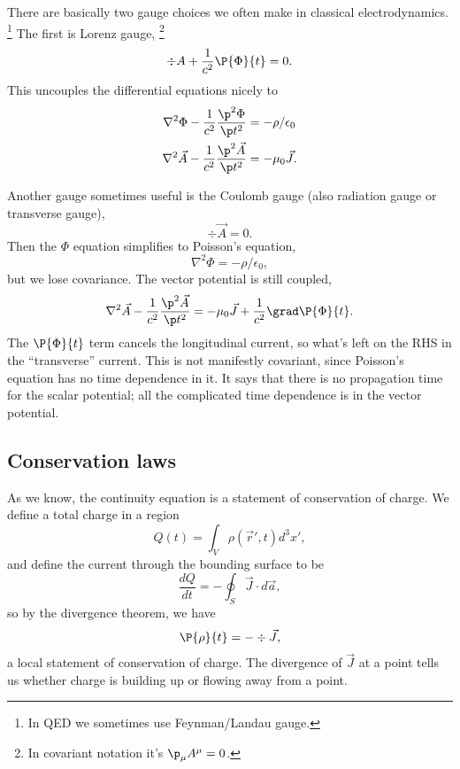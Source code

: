 There are basically two gauge choices we often make in classical electrodynamics.%
    \footnote{In QED we sometimes use Feynman/Landau gauge.}
The first is Lorenz gauge,%
    \footnote{In covariant notation it's $\p_\mu A^\mu=0$.}
\begin{equation}
    \div A + \frac{1}{c^2}\P{\Phi}{t} =0.
\end{equation}
This uncouples the differential equations 
nicely to
\begin{align}
    \nabla^2 \Phi -\frac{1}{c^2} \frac{\p^2\Phi}{\p t^2} &= -\rho/\epsilon_0\\
    \nabla^2 \vec A -\frac{1}{c^2} \frac{\p^2\vec A}{\p t^2} &= -\mu_0 \vec J.
\end{align}

Another gauge sometimes useful is the Coulomb gauge (also radiation gauge or transverse gauge),
\begin{equation}
    \div \vec A=0.
\end{equation}
Then the $\Phi$ equation simplifies to Poisson's equation,
\begin{equation}
    \nabla^2 \Phi = - \rho/\epsilon_0,
\end{equation}
but we lose covariance. The vector potential is still coupled,
\begin{equation}
    \nabla^2 \vec A - \frac{1}{c^2} \frac{\p^2 \vec A}{\p t^2} = -\mu_0 \vec J + \frac{1}{c^2} \grad \P{\Phi}{t}.
\end{equation}
The $\P{\Phi}{t}$ term cancels the longitudinal current, so what's left on the RHS in the ``transverse'' current.
This is not manifestly covariant, since Poisson's equation has no time dependence in it. It says that there is no propagation time for the scalar potential; all the complicated time dependence is in the vector potential.

\subsection*{Conservation laws}
As we know, the continuity equation is a statement of conservation of charge. We define a total charge in a region
\begin{equation}
    Q(t) =\int_V \rho(\vec r',t) d^3x',
\end{equation}
and define the current through the bounding surface to be
\begin{equation}
    \frac{dQ}{dt} = -\oint_S \vec J \cdot d\vec a,
\end{equation}
so by the divergence theorem, we have
\begin{equation}
    \P{\rho}{t} = -\div \vec J,
\end{equation}
a local statement of conservation of charge. The divergence of $\vec J$ at a point tells us whether charge is building up or flowing away from a point.

